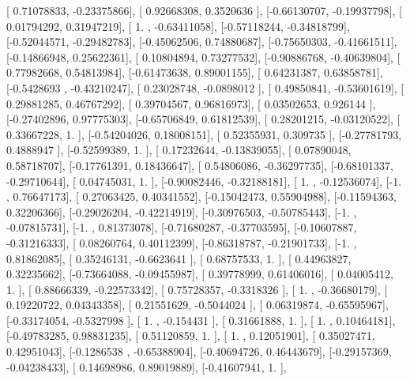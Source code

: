 \documentclass{article}
\begin{document}
       [ 0.71078833, -0.23375866],
       [ 0.92668308,  0.3520636 ],
       [-0.66130707, -0.19937798],
       [ 0.01794292,  0.31947219],
       [ 1.        , -0.63411058],
       [-0.57118244, -0.34818799],
       [-0.52044571, -0.29482783],
       [-0.45062506,  0.74880687],
       [-0.75650303, -0.41661511],
       [-0.14866948,  0.25622361],
       [ 0.10804894,  0.73277532],
       [-0.90886768, -0.40639804],
       [ 0.77982668,  0.54813984],
       [-0.61473638,  0.89001155],
       [ 0.64231387,  0.63858781],
       [-0.5428693 , -0.43210247],
       [ 0.23028748, -0.0898012 ],
       [ 0.49850841, -0.53601619],
       [ 0.29881285,  0.46767292],
       [ 0.39704567,  0.96816973],
       [ 0.03502653,  0.926144  ],
       [-0.27402896,  0.97775303],
       [-0.65706849,  0.61812539],
       [ 0.28201215, -0.03120522],
       [ 0.33667228,  1.        ],
       [-0.54204026,  0.18008151],
       [ 0.52355931,  0.309735  ],
       [-0.27781793,  0.4888947 ],
       [-0.52599389,  1.        ],
       [ 0.17232644, -0.13839055],
       [ 0.07890048,  0.58718707],
       [-0.17761391,  0.18436647],
       [ 0.54806086, -0.36297735],
       [-0.68101337, -0.29710644],
       [ 0.04745031,  1.        ],
       [-0.90082446, -0.32188181],
       [ 1.        , -0.12536074],
       [-1.        ,  0.76647173],
       [ 0.27063425,  0.40341552],
       [-0.15042473,  0.55904988],
       [-0.11594363,  0.32206366],
       [-0.29026204, -0.42214919],
       [-0.30976503, -0.50785443],
       [-1.        , -0.07815731],
       [-1.        ,  0.81373078],
       [-0.71680287, -0.37703595],
       [-0.10607887, -0.31216333],
       [ 0.08260764,  0.40112399],
       [-0.86318787, -0.21901733],
       [-1.        ,  0.81862085],
       [ 0.35246131, -0.6623641 ],
       [ 0.68757533,  1.        ],
       [ 0.44963827,  0.32235662],
       [-0.73664088, -0.09455987],
       [ 0.39778999,  0.61406016],
       [ 0.04005412,  1.        ],
       [ 0.88666339, -0.22573342],
       [ 0.75728357, -0.3318326 ],
       [ 1.        , -0.36680179],
       [ 0.19220722,  0.04343358],
       [ 0.21551629, -0.5044024 ],
       [ 0.06319874, -0.65595967],
       [-0.33174054, -0.5327998 ],
       [ 1.        , -0.154431  ],
       [ 0.31661888,  1.        ],
       [ 1.        ,  0.10464181],
       [-0.49783285,  0.98831235],
       [ 0.51120859,  1.        ],
       [ 1.        ,  0.12051901],
       [ 0.35027471,  0.42951043],
       [-0.1286538 , -0.65388904],
       [-0.40694726,  0.46443679],
       [-0.29157369, -0.04238433],
       [ 0.14698986,  0.89019889],
       [-0.41607941,  1.        ],
\end{document}

